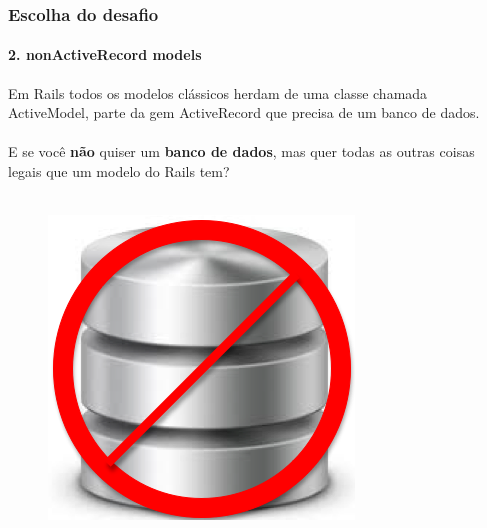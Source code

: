 \documentclass{beamer}
\begin{document}
\begin{frame}
  \frametitle{Escolha do desafio}
  \framesubtitle{2. nonActiveRecord models}

  Em Rails todos os modelos clássicos herdam de uma classe chamada ActiveModel, parte da gem ActiveRecord que precisa de um banco de dados. \\~\\

  E se você \textbf{não} quiser um \textbf{banco de dados}, mas quer todas as outras coisas legais que um modelo do Rails tem? \\~\\

  \begin{multicols}{2}
    \begin{figure}[htb]
      \begin{center}
        \includegraphics[scale=0.1]{no-database.png}
      \end{center}
    \end{figure}

    \columnbreak


\end{multicols}
\end{frame}
\end{document}
